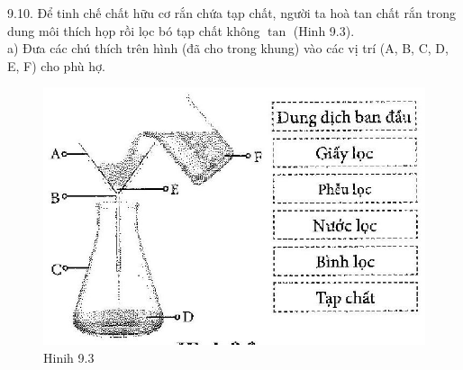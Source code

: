\documentclass[10pt]{article}
\begin{document}
9.10. Để tinh chế chất hữu cơ rắn chứa tạp chất, người ta hoà tan chất rắn trong dung môi thích họp rồi lọc bó tạp chất không $\tan$ (Hinh 9.3).\\
a) Đưa các chú thích trên hình (đã cho trong khung) vào các vị trí (A, B, C, D, E, F) cho phù hợ.

\begin{figure}[h]
\begin{center}
  \includegraphics[width=\textwidth]{2025_10_23_f2823ef970776205e47bg-28}
\captionsetup{labelformat=empty}
\caption{Hinih 9.3}
\end{center}
\end{figure}
\end{document}
